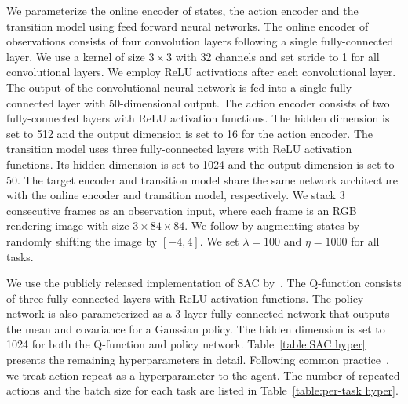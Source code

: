 \documentclass[a4paper,12pt]{article}
\begin{document}
We parameterize the online encoder of states, the action encoder and the transition model using feed forward neural networks. The online encoder of observations consists of four convolution layers following a single fully-connected layer. We use a kernel of size $3\times 3$ with 32 channels and set stride to 1 for all convolutional layers. We employ ReLU activations after each convolutional layer. The output of the convolutional neural network is fed into a single fully-connected layer with 50-dimensional output. The action encoder consists of two fully-connected layers  with ReLU activation functions. The hidden dimension is set to 512 and the output dimension is set to 16 for the action encoder. The transition model uses three fully-connected layers with ReLU activation functions. Its hidden dimension is set to 1024 and the output dimension is set to 50.  The target encoder and transition model share the same network architecture with the online encoder and transition model, respectively. We stack 3 consecutive frames as an observation input, where each frame is an RGB rendering image with size $3 \times 84 \times 84$. We follow \citet{lee2020predictive} by augmenting states by randomly shifting the image by $[-4, 4]$. We set $\lambda = 100$ and $\eta=1000$ for all tasks.

We use the publicly released implementation of SAC by~\citet{yarats2019improving}. The Q-function consists of three fully-connected layers with ReLU activation functions. The policy network is also parameterized as a 3-layer fully-connected network that outputs the mean and covariance for a Gaussian policy. The hidden dimension is set to 1024 for both the Q-function and policy network. Table~\ref{table:SAC hyper} presents the remaining hyperparameters in detail. Following common practice~\cite{hjelm2018learning, yarats2019improving, laskin2020curl}, we treat action repeat as a hyperparameter to the agent. The number of repeated actions and the batch size for each task are listed in Table~\ref{table:per-task hyper}. 
\end{document}
